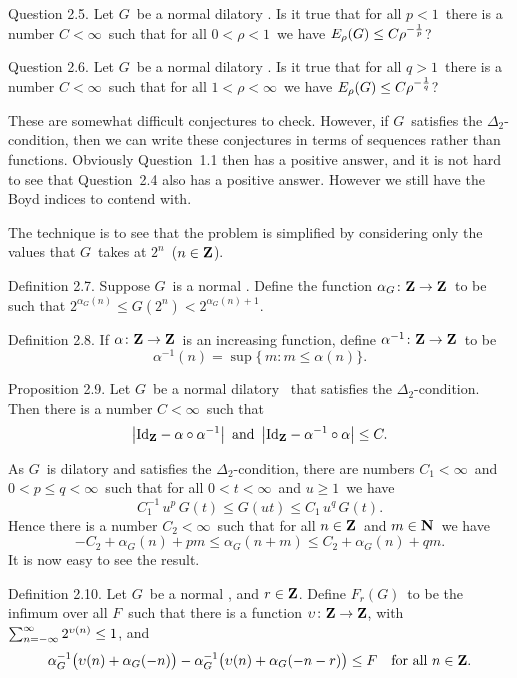 \proclaim Question 2.5. Let $G$\ be a normal
dilatory \af. Is it true that for all
$p<1$\ there is a number $C<\infty$\ such that for all
$0<\rho<1$\ we have $E_\rho(G) \le C \rho^{-{1\over p}}$?
 
\proclaim Question 2.6. Let $G$\ be a normal
dilatory \af. Is it true that for all
$q>1$\ there is a number $C<\infty$\ such that for all
$1<\rho<\infty$\ we have $E_\rho(G) \le C \rho^{-{1\over q}}$?
 
These are somewhat difficult conjectures
to check. However, if $G$\ satisfies
the $\Delta_2$-condition, then we can write these conjectures in terms of
sequences rather than functions. Obviously
Question~1.1 then has a positive
answer, and it is not hard to see that Question~2.4 also has a positive
answer. However we still have the Boyd indices to contend with.
 
The technique is to see that the problem is simplified by
considering only the values that $G$\ takes at $2^n$\ ($n\in{\bf Z}$).
 
\proclaim Definition 2.7. Suppose $G$\ is a normal \af. Define the
function $\alpha_G\colon{\bf Z}\to{\bf Z}$\ to be
such that $2^{\alpha_G(n)} \le G(2^n)
< 2^{\alpha_G(n)+1}$.
 
\proclaim Definition 2.8. If
$\alpha\colon{\bf Z}\to{\bf Z}$\ is an increasing function,
define $\alpha^{-1}\colon{\bf Z}\to{\bf Z}$\ to be
$$ \alpha^{-1} (n) = \sup\{\, m : m\le \alpha(n) \} .$$
 
\proclaim Proposition 2.9. Let $G$\ be a
normal dilatory \af\ that satisfies the
$\Delta_2$-condition. Then there is a number $C<\infty$\ such that
$$ \left|\mathord{\rm Id}_{\bf Z} - \alpha\circ\alpha^{-1}\right| \hbox{ and }
   \left|\mathord{\rm Id}_{\bf Z} - \alpha^{-1}\circ\alpha\right| \le C .$$
 
\Proof As $G$\ is dilatory and satisfies
the $\Delta_2$-condition, there are
numbers $C_1<\infty$\ and $0<p\le
q<\infty$\ such that for all $0<t<\infty$\
and $u\ge 1$\ we have
$$ C_1^{-1} \,u^p\, G(t) \le G(ut) \le C_1\,u^q\,G(t) .$$
Hence there is a number $C_2<\infty$\
such that for all $n\in{\bf Z}$\ and $m\in{\bf N}$\
we have
$$ -C_2 + \alpha_G(n) + pm \le \alpha_G(n+m)
\le C_2 + \alpha_G(n) + qm .$$
It is now easy to see the result.
\endproof
 
\proclaim Definition 2.10. Let $G$\ be a normal \af, and $r\in{\bf Z}$. Define
$F_r(G)$\ to be the infimum over all $F$\ such that there is a function
$\upsilon\colon{\bf Z}\to{\bf Z}$, with $\sum_{n=-\infty}^\infty 2^{\upsilon(n)} \le 1$, and
$$ \alpha_G^{-1}\bigl(\upsilon(n) + \alpha_G(-n)\bigr)
   - \alpha_G^{-1}\bigl(\upsilon(n) + \alpha_G(-n-r)\bigr)
   \le F
   \quad\hbox{for all $n\in{\bf Z}$} .$$
 
